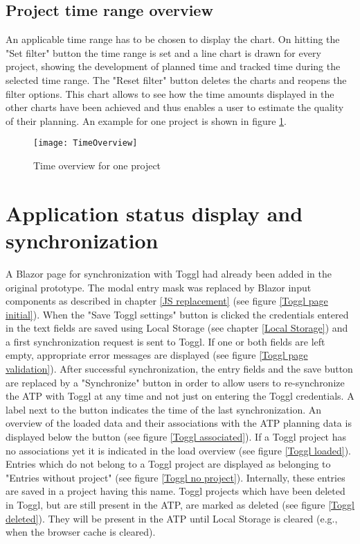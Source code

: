 \subsection{Project time range overview}
An applicable time range has to be chosen to display the chart. On hitting the "Set filter" button the time range is set and a line chart is drawn for every project, showing the development of planned time and tracked time during the selected time range. The "Reset filter" button deletes the charts and reopens the filter options. This chart allows to see how the time amounts displayed in the other charts have been achieved and thus enables a user to estimate the quality of their planning. An example for one project is shown in figure \ref{timeOverview}.
\begin{figure}[H]
	\centering
	\texttt{[image: TimeOverview]}
	\caption{Time overview for one project}
	\label{timeOverview}
\end{figure}

\section{Application status display and synchronization} \label{Status display}
A Blazor page for synchronization with Toggl had already been added in the original prototype. The modal entry mask was replaced by Blazor input components as described in chapter \ref{JS replacement} (see figure \ref{Toggl page initial}). When the "Save Toggl settings" button is clicked the credentials entered in the text fields are saved using Local Storage (see chapter \ref{Local Storage}) and a first synchronization request is sent to Toggl. If one or both fields are left empty, appropriate error messages are displayed (see figure \ref{Toggl page validation}). After successful synchronization, the entry fields and the save button are replaced by a "Synchronize" button in order to allow users to re-synchronize the ATP with Toggl at any time and not just on entering the Toggl credentials. A label next to the button indicates the time of the last synchronization. An overview of the loaded data and their associations with the ATP planning data is displayed below the button (see figure \ref{Toggl associated}). If a Toggl project has no associations yet it is indicated in the load overview (see figure \ref{Toggl loaded}). Entries which do not belong to a Toggl project are displayed as belonging to "Entries without project" (see figure \ref{Toggl no project}). Internally, these entries are saved in a project having this name. Toggl projects which have been deleted in Toggl, but are still present in the ATP, are marked as deleted (see figure \ref{Toggl deleted}). They will be present in the ATP until Local Storage is cleared (e.g., when the browser cache is cleared).

